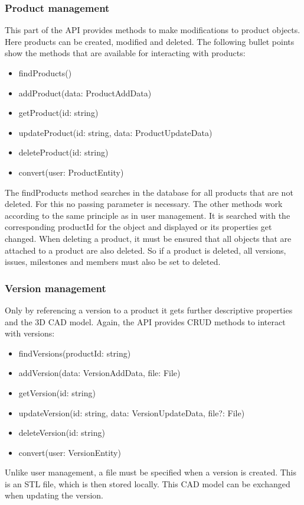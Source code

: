     \subsubsection*{Product management}
    This part of the API provides methods to make modifications to product objects. Here products can be created, modified and deleted. The following bullet points show the methods that are available for interacting with products:
    \begin{itemize}
        \item findProducts()
        \item addProduct(data: ProductAddData)
        \item getProduct(id: string)
        \item updateProduct(id: string, data: ProductUpdateData)
        \item deleteProduct(id: string)
        \item convert(user: ProductEntity)
    \end{itemize}
    The findProducts method searches in the database for all products that are not deleted. For this no passing parameter is necessary. The other methods work according to the same principle as in user management. It is searched with the corresponding productId for the object and displayed or its properties get changed. When deleting a product, it must be ensured that all objects that are attached to a product are also deleted. So if a product is deleted, all versions, issues, milestones and members must also be set to deleted.

    \subsubsection*{Version management}
    Only by referencing a version to a product it gets further descriptive properties and the 3D CAD model. Again, the API provides CRUD methods to interact with versions:
    \begin{itemize}
        \item findVersions(productId: string)
        \item addVersion(data: VersionAddData, file: File)
        \item getVersion(id: string)
        \item updateVersion(id: string, data: VersionUpdateData, file?: File)
        \item deleteVersion(id: string)
        \item convert(user: VersionEntity)
    \end{itemize}
    Unlike user management, a file must be specified when a version is created. This is an STL file, which is then stored locally. This CAD model can be exchanged when updating the version.

